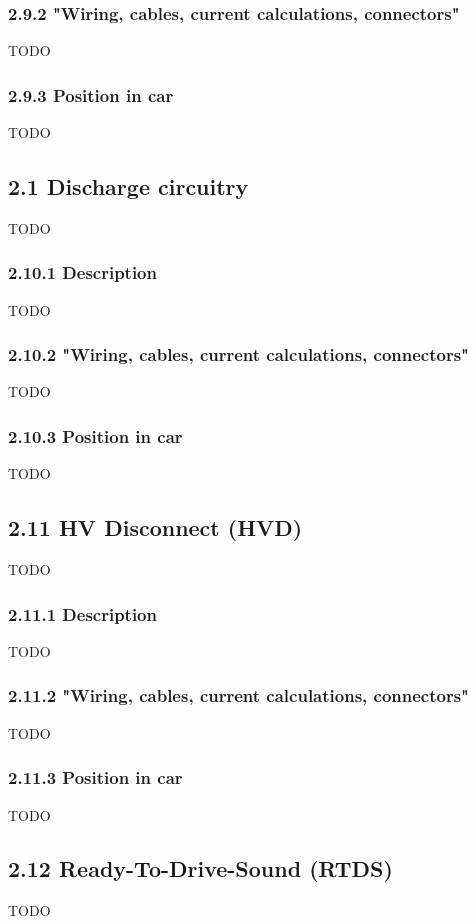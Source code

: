 \documentclass{article}
\begin{document}
\subsubsection*{2.9.2 "Wiring, cables, current calculations, connectors"}
TODO

\subsubsection*{2.9.3 Position in car}
TODO

\subsection*{2.1 Discharge circuitry}
TODO

\subsubsection*{2.10.1 Description}
TODO

\subsubsection*{2.10.2 "Wiring, cables, current calculations, connectors"}
TODO

\subsubsection*{2.10.3 Position in car}
TODO

\subsection*{2.11 HV Disconnect (HVD)}
TODO

\subsubsection*{2.11.1 Description}
TODO

\subsubsection*{2.11.2 "Wiring, cables, current calculations, connectors"}
TODO

\subsubsection*{2.11.3 Position in car}
TODO

\subsection*{2.12 Ready-To-Drive-Sound (RTDS)}
TODO
\end{document}
